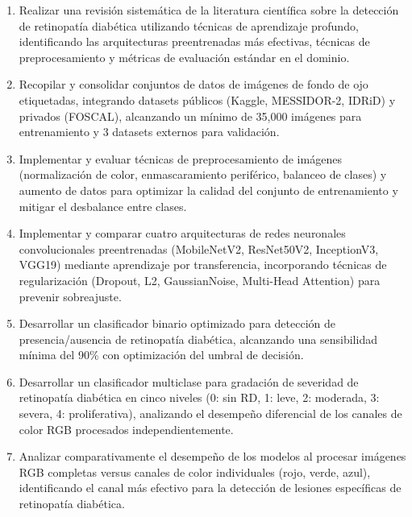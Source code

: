 \begin{enumerate}[label=\textbf{OE\arabic*.}, leftmargin=*, itemsep=0.5em]

    \item Realizar una revisión sistemática de la literatura científica sobre la detección de retinopatía diabética utilizando técnicas de aprendizaje profundo, identificando las arquitecturas preentrenadas más efectivas, técnicas de preprocesamiento y métricas de evaluación estándar en el dominio.

    \item Recopilar y consolidar conjuntos de datos de imágenes de fondo de ojo etiquetadas, integrando datasets públicos (Kaggle, MESSIDOR-2, IDRiD) y privados (FOSCAL), alcanzando un mínimo de 35,000 imágenes para entrenamiento y 3 datasets externos para validación.

    \item Implementar y evaluar técnicas de preprocesamiento de imágenes (normalización de color, enmascaramiento periférico, balanceo de clases) y aumento de datos para optimizar la calidad del conjunto de entrenamiento y mitigar el desbalance entre clases.

    \item Implementar y comparar cuatro arquitecturas de redes neuronales convolucionales preentrenadas (MobileNetV2, ResNet50V2, InceptionV3, VGG19) mediante aprendizaje por transferencia, incorporando técnicas de regularización (Dropout, L2, GaussianNoise, Multi-Head Attention) para prevenir sobreajuste.

    \item Desarrollar un clasificador binario optimizado para detección de presencia/ausencia de retinopatía diabética, alcanzando una sensibilidad mínima del 90\% con optimización del umbral de decisión.

    \item Desarrollar un clasificador multiclase para gradación de severidad de retinopatía diabética en cinco niveles (0: sin RD, 1: leve, 2: moderada, 3: severa, 4: proliferativa), analizando el desempeño diferencial de los canales de color RGB procesados independientemente.

    \item Analizar comparativamente el desempeño de los modelos al procesar imágenes RGB completas versus canales de color individuales (rojo, verde, azul), identificando el canal más efectivo para la detección de lesiones específicas de retinopatía diabética.


\end{enumerate}
